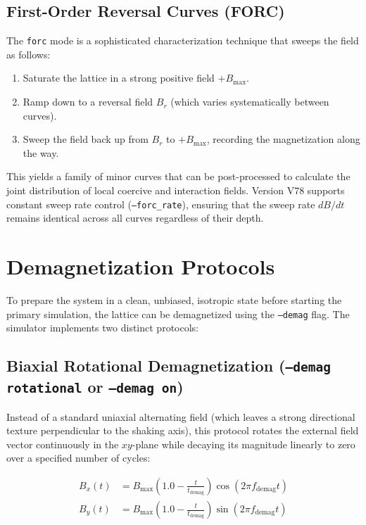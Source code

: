 \documentclass[11pt,a4paper]{article}
\newcommand{\code}[1]{\texttt{#1}}
\begin{document}
\subsection{First-Order Reversal Curves (FORC)}
The \code{forc} mode is a sophisticated characterization technique that sweeps the field as follows:
\begin{enumerate}
    \item Saturate the lattice in a strong positive field $+B_{\max}$.
    \item Ramp down to a reversal field $B_r$ (which varies systematically between curves).
    \item Sweep the field back up from $B_r$ to $+B_{\max}$, recording the magnetization along the way.
\end{enumerate}
This yields a family of minor curves that can be post-processed to calculate the joint distribution of local coercive and interaction fields. Version V78 supports constant sweep rate control (\code{--forc\_rate}), ensuring that the sweep rate $dB/dt$ remains identical across all curves regardless of their depth.

\section{Demagnetization Protocols}
\label{sec:demag}

To prepare the system in a clean, unbiased, isotropic state before starting the primary simulation, the lattice can be demagnetized using the \code{--demag} flag. The simulator implements two distinct protocols:

\subsection{Biaxial Rotational Demagnetization (\code{--demag rotational} or \code{--demag on})}
Instead of a standard uniaxial alternating field (which leaves a strong directional texture perpendicular to the shaking axis), this protocol rotates the external field vector continuously in the $xy$-plane while decaying its magnitude linearly to zero over a specified number of cycles:

\begin{align}
B_x(t) &= B_{\max} \left(1.0 - \frac{t}{t_{\text{demag}}}\right) \cos(2\pi f_{\text{demag}} t) \\
B_y(t) &= B_{\max} \left(1.0 - \frac{t}{t_{\text{demag}}}\right) \sin(2\pi f_{\text{demag}} t)
\end{align}
\end{document}
